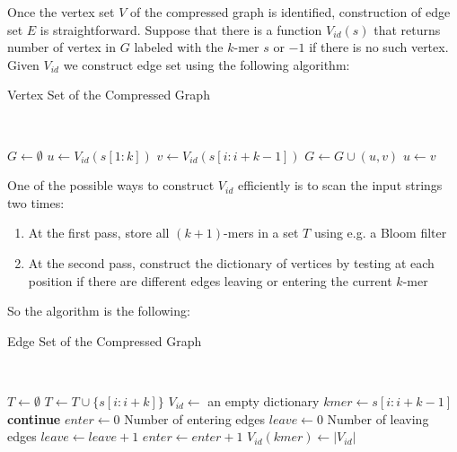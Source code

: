 \documentclass[a4paper, 12pt]{scrartcl}
\begin{document}
Once the vertex set $V$ of the compressed graph is identified, construction of edge set $E$ is straightforward.
Suppose that there is a function $V_{id}(s)$ that returns number of vertex in $G$ labeled with the $k$-mer $s$ or $-1$ if there is no such vertex.
Given $V_{id}$ we construct edge set using the following algorithm:
\begin{algorithm}[H]
\caption{Vertex Set of the Compressed Graph} 
 \\ 
\begin{algorithmic}[1]
\State $G \gets \emptyset$
	\State $u \gets V_{id}(s[1:k])$
		\State $v \gets V_{id}(s[i:i + k - 1])$
			\State $G \gets G \cup (u, v)$
			\State $u \gets v$
		\EndIf
	\EndFor
\EndFor
\end{algorithmic}
\end{algorithm}

One of the possible ways to construct $V_{id}$ efficiently is to scan the input strings two times:
\begin{enumerate}
\item At the first pass, store all $(k + 1)$-mers in a set $T$ using e.g. a Bloom filter
\item At the second pass, construct the dictionary of vertices by testing at each position if there are different edges leaving or entering the current $k$-mer 
\end{enumerate}
So the algorithm is the following:
\begin{algorithm}[H]
\caption{Edge Set of the Compressed Graph} 
 \\ 
\begin{algorithmic}[1]
\State $T \gets \emptyset$
		\State $T \gets T \cup \{s[i:i + k]\}$
	\EndFor
\EndFor
\State $V_{id} \gets $ an empty dictionary
		\State $kmer \gets s[i: i + k - 1]$
			\State \textbf{continue}
		\EndIf
		\State $enter \gets 0$ \Comment Number of entering edges
		\State $leave \gets 0$ \Comment Number of leaving edges
				\State $leave \gets leave + 1$
			\EndIf
				\State $enter \gets enter + 1$
			\EndIf
		\EndFor
			\State $V_{id}(kmer) \gets |V_{id}|$
		\EndIf
	\EndFor
\EndFor
\end{algorithmic}
\end{algorithm}
\end{document}
